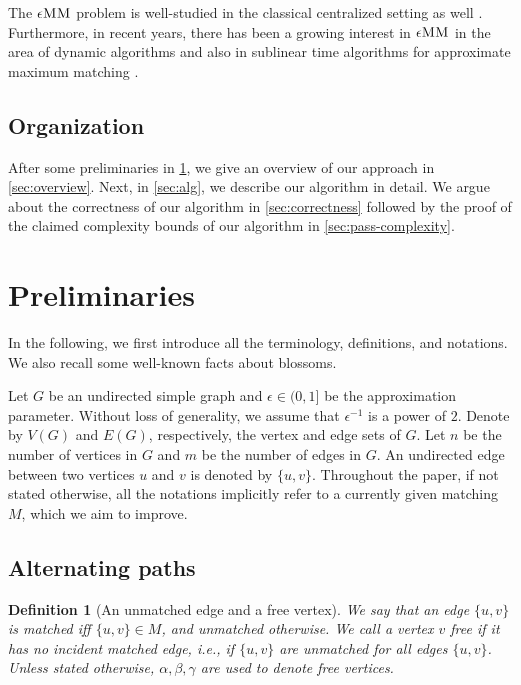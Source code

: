 \documentclass{article}
\newcommand{\alp}{\alpha}
\newcommand{\eps}{\epsilon}
\newtheorem{definition}[theorem]{Definition}
\newcommand{\eMM}{\eps\textsc{MM}}
\begin{document}
The $\eMM$ problem is well-studied in the classical centralized setting as well \cite{DrakeH03, DP14}.
Furthermore, in recent years, there has been a growing interest in $\eMM$ in the area of dynamic algorithms \cite{GLSSS19,BGS20, ABD22,AssadiBKL23,BlikstadK23,ZhengH23,BhattacharyaKS23,behnezhad2024fully,assadi2024improved} and also in sublinear time algorithms for approximate maximum matching \cite{Behnezhad21,BehnezhadRR23,BehnezhadRRS23}. 

\subsection{Organization}
After some preliminaries in \cref{sec:preliminaries}, we give an overview of our approach in \cref{sec:overview}. Next, in \cref{sec:alg}, we describe our algorithm in detail. We argue about the correctness of our algorithm in \cref{sec:correctness} followed by the proof of the claimed complexity bounds of our algorithm in \cref{sec:pass-complexity}.



\section{Preliminaries}\label{sec:preliminaries}
In the following, we first introduce all the terminology, definitions, and notations. We also recall some well-known facts about blossoms.

Let $G$ be an undirected simple graph and $\eps \in (0, 1]$ be the approximation parameter.
Without loss of generality, we assume that $\eps^{-1}$ is a power of $2$.
Denote by $V(G)$ and $E(G)$, respectively, the vertex and edge sets of $G$.
Let $n$ be the number of vertices in $G$ and $m$ be the number of edges in $G$.
An undirected edge between two vertices $u$ and $v$ is denoted by $\{u, v\}$.
Throughout the paper, if not stated otherwise, all the notations implicitly refer to a currently given matching $M$, which we aim to improve.


\subsection{Alternating paths}

\begin{definition}[An unmatched edge and a free vertex] We say that an edge $\{u, v\}$ is \emph{matched} iff $\{u, v\} \in M$, and \emph{unmatched} otherwise.
We call a vertex $v$ \emph{free} if it has no incident matched edge, i.e., if $\{u, v\}$ are unmatched for all edges $\{u, v\}$.
Unless stated otherwise, $\alp, \beta, \gamma$ are used to denote free vertices. 
\end{definition}
\end{document}
